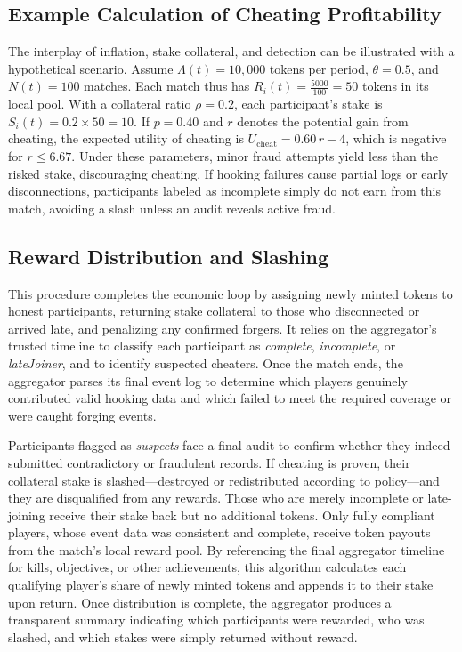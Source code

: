 \documentclass[11pt]{article}
\begin{document}
\subsection{Example Calculation of Cheating Profitability}
\label{sec:concreteExample}
The interplay of inflation, stake collateral, and detection can be illustrated with a hypothetical scenario. Assume $\Lambda(t)=10{,}000$ tokens per period, $\theta=0.5$, and $N(t)=100$ matches. Each match thus has $R_i(t)=\frac{5000}{100}=50$ tokens in its local pool. With a collateral ratio $\rho=0.2$, each participant’s stake is $S_i(t)=0.2 \times 50=10$. If $p=0.40$ and $r$ denotes the potential gain from cheating, the expected utility of cheating is $U_{\text{cheat}}=0.60\,r - 4$, which is negative for $r \le 6.67$. Under these parameters, minor fraud attempts yield less than the risked stake, discouraging cheating. If hooking failures cause partial logs or early disconnections, participants labeled as incomplete simply do not earn from this match, avoiding a slash unless an audit reveals active fraud.



\subsection{Reward Distribution and Slashing}
\label{sec:rewardAndSlashingExpl}

This procedure completes the economic loop by assigning newly minted tokens to honest participants, returning stake collateral to those who disconnected or arrived late, and penalizing any confirmed forgers. It relies on the aggregator’s trusted timeline to classify each participant as \emph{complete}, \emph{incomplete}, or \emph{lateJoiner}, and to identify suspected cheaters. Once the match ends, the aggregator parses its final event log to determine which players genuinely contributed valid hooking data and which failed to meet the required coverage or were caught forging events.

Participants flagged as \emph{suspects} face a final audit to confirm whether they indeed submitted contradictory or fraudulent records. If cheating is proven, their collateral stake is slashed—destroyed or redistributed according to policy—and they are disqualified from any rewards. Those who are merely incomplete or late-joining receive their stake back but no additional tokens. Only fully compliant players, whose event data was consistent and complete, receive token payouts from the match’s local reward pool. By referencing the final aggregator timeline for kills, objectives, or other achievements, this algorithm calculates each qualifying player’s share of newly minted tokens and appends it to their stake upon return. Once distribution is complete, the aggregator produces a transparent summary indicating which participants were rewarded, who was slashed, and which stakes were simply returned without reward.
\end{document}
